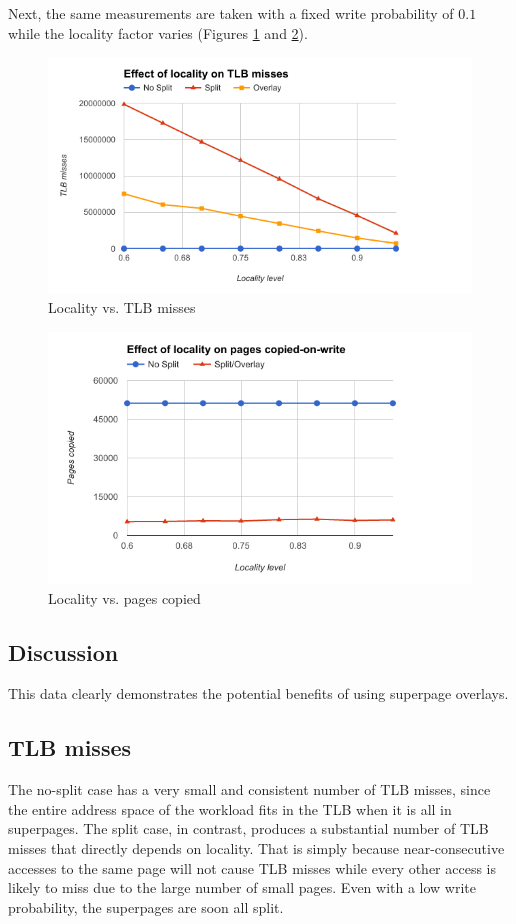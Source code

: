 Next, the same measurements are taken with a fixed write probability of $0.1$ while the locality factor varies (Figures \ref{fig:locality_misses} and \ref{fig:locality_copied}).
\begin{figure}
    \centering
    \includegraphics[width=6in]{Figures/locality_tlb}
    \caption{Locality vs. TLB misses}
    \label{fig:locality_misses}
\end{figure}
\begin{figure}
    \centering
    \includegraphics[width=6in]{Figures/locality_copied}
    \caption{Locality vs. pages copied}
    \label{fig:locality_copied}
\end{figure}

\subsection{Discussion}

This data clearly demonstrates the potential benefits of using superpage overlays.

\subsection{TLB misses}
The no-split case has a very small and consistent number of TLB misses, since the entire address space of the workload fits in the TLB when it is all in superpages. The split case, in contrast, produces a substantial number of TLB misses that directly depends on locality. That is simply because near-consecutive accesses to the same page will not cause TLB misses while every other access is likely to miss due to the large number of small pages. Even with a low write probability, the superpages are soon all split.

